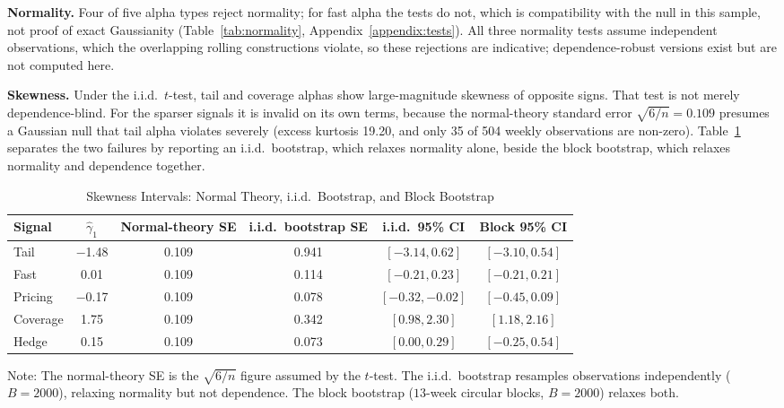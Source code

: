 \documentclass[11pt]{article}
\begin{document}
\textbf{Normality.} Four of five alpha types reject normality; for fast alpha the tests do not, which is compatibility with the null in this sample, not proof of exact Gaussianity (Table~\ref{tab:normality}, Appendix~\ref{appendix:tests}). All three normality tests assume independent observations, which the overlapping rolling constructions violate, so these rejections are indicative; dependence-robust versions exist \citep{bai2005tests} but are not computed here.

\textbf{Skewness.} Under the i.i.d.\ $t$-test, tail and coverage alphas show large-magnitude skewness of opposite signs. That test is not merely dependence-blind. For the sparser signals it is invalid on its own terms, because the normal-theory standard error $\sqrt{6/n} = 0.109$ presumes a Gaussian null that tail alpha violates severely (excess kurtosis 19.20, and only 35 of 504 weekly observations are non-zero). Table~\ref{tab:bootcompare} separates the two failures by reporting an i.i.d.\ bootstrap, which relaxes normality alone, beside the block bootstrap, which relaxes normality and dependence together.

\begin{table}[H]
\centering
\caption{Skewness Intervals: Normal Theory, i.i.d.\ Bootstrap, and Block Bootstrap}
\label{tab:bootcompare}
\small
\begin{tabular}{@{}lccccc@{}}
\toprule
Signal & $\hat{\gamma}_1$ & Normal-theory SE & i.i.d.\ bootstrap SE & i.i.d.\ 95\% CI & Block 95\% CI \\
\midrule
Tail & $-$1.48 & 0.109 & 0.941 & $[-3.14, 0.62]$ & $[-3.10, 0.54]$ \\
Fast & 0.01 & 0.109 & 0.114 & $[-0.21, 0.23]$ & $[-0.21, 0.21]$ \\
Pricing & $-$0.17 & 0.109 & 0.078 & $[-0.32, -0.02]$ & $[-0.45, 0.09]$ \\
Coverage & 1.75 & 0.109 & 0.342 & $[0.98, 2.30]$ & $[1.18, 2.16]$ \\
Hedge & 0.15 & 0.109 & 0.073 & $[0.00, 0.29]$ & $[-0.25, 0.54]$ \\
\bottomrule
\end{tabular}
\par\vspace{0.3em}
\parbox{\linewidth}{\footnotesize Note: The normal-theory SE is the $\sqrt{6/n}$ figure assumed by the $t$-test. The i.i.d.\ bootstrap resamples observations independently ($B = 2000$), relaxing normality but not dependence. The block bootstrap ($13$-week circular blocks, $B = 2000$) relaxes both.}
\end{table}
\end{document}
